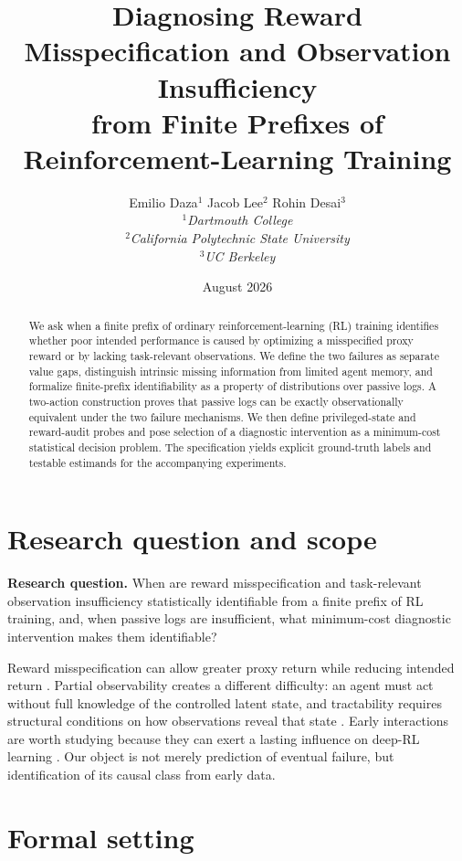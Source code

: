 \documentclass[9pt,twocolumn]{extarticle}
\title{Diagnosing Reward Misspecification and Observation Insufficiency\\
from Finite Prefixes of Reinforcement-Learning Training}
\author{%
Emilio Daza$^{1}$ \qquad Jacob Lee$^{2}$ \qquad Rohin Desai$^{3}$\\[0.45em]
\small $^{1}$\textit{Dartmouth College}\\
\small $^{2}$\textit{California Polytechnic State University}\\
\small $^{3}$\textit{UC Berkeley}}
\date{August 2026}
\begin{document}
\raggedbottom
\maketitle
\vspace{-1.2em}

\begin{abstract}
We ask when a finite prefix of ordinary reinforcement-learning (RL) training
identifies whether poor intended performance is caused by optimizing a
misspecified proxy reward or by lacking task-relevant observations. We define
the two failures as separate value gaps, distinguish intrinsic missing
information from limited agent memory, and formalize finite-prefix
identifiability as a property of distributions over passive logs. A two-action
construction proves that passive logs can be exactly observationally
equivalent under the two failure mechanisms. We then define privileged-state
and reward-audit probes and pose selection of a diagnostic intervention as a
minimum-cost statistical decision problem. The specification yields explicit
ground-truth labels and testable estimands for the accompanying experiments.
\end{abstract}

\section{Research question and scope}

\textbf{Research question.} When are reward misspecification and task-relevant
observation insufficiency statistically identifiable from a finite prefix of
RL training, and, when passive logs are insufficient, what minimum-cost
diagnostic intervention makes them identifiable?

Reward misspecification can allow greater proxy return while reducing intended
return \cite{pan2022effects}. Partial observability creates a different
difficulty: an agent must act without full knowledge of the controlled latent
state, and tractability requires structural conditions on how observations
reveal that state \cite{liu2022pomdp}. Early interactions are worth studying
because they can exert a lasting influence on deep-RL learning
\cite{nikishin2022primacy}. Our object is not merely prediction of eventual
failure, but identification of its causal class from early data.

\section{Formal setting}
\end{document}
